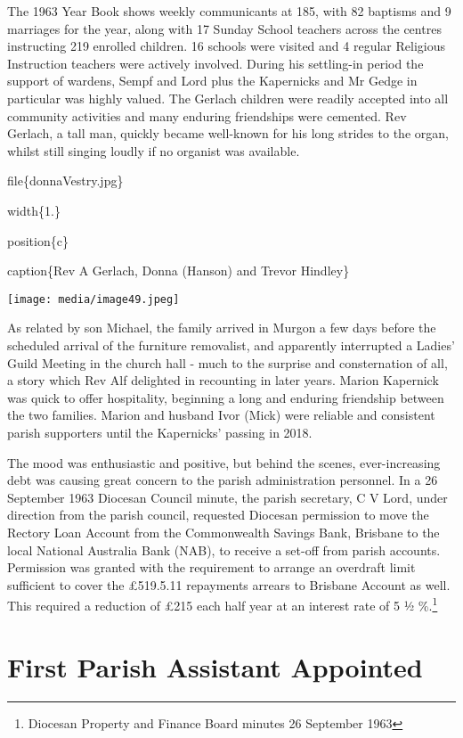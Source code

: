 The 1963 Year Book shows weekly communicants at 185, with 82 baptisms and 9 marriages for the year, along with 17 Sunday School teachers across the centres instructing 219 enrolled children. 16 schools were visited and 4 regular Religious Instruction teachers were actively involved. During his settling-in period the support of wardens, Sempf and Lord plus the Kapernicks and Mr Gedge in particular was highly valued. The Gerlach children were readily accepted into all community activities and many enduring friendships were cemented. Rev Gerlach, a tall man, quickly became well-known for his long strides to the organ, whilst still singing loudly if no organist was available.

file\{donnaVestry.jpg\}

width\{1.\}

position\{c\}

caption\{Rev A Gerlach, Donna (Hanson) and Trevor Hindley\}

\texttt{[image: media/image49.jpeg]}

As related by son Michael, the family arrived in Murgon a few days before the scheduled arrival of the furniture removalist, and apparently interrupted a Ladies' Guild Meeting in the church hall - much to the surprise and consternation of all, a story which Rev Alf delighted in recounting in later years. Marion Kapernick was quick to offer hospitality, beginning a long and enduring friendship between the two families. Marion and husband Ivor (Mick) were reliable and consistent parish supporters until the Kapernicks' passing in 2018.

The mood was enthusiastic and positive, but behind the scenes, ever-increasing debt was causing great concern to the parish administration personnel. In a 26 September 1963 Diocesan Council minute, the parish secretary, C V Lord, under direction from the parish council, requested Diocesan permission to move the Rectory Loan Account from the Commonwealth Savings Bank, Brisbane to the local National Australia Bank (NAB), to receive a set-off from parish accounts. Permission was granted with the requirement to arrange an overdraft limit sufficient to cover the £519.5.11 repayments arrears to Brisbane Account as well. This required a reduction of £215 each half year at an interest rate of 5 ½ \%.\footnote{Diocesan Property and Finance Board minutes 26 September 1963}

\hypertarget{first-parish-assistant-appointed}{%
\section{First Parish Assistant Appointed}\label{first-parish-assistant-appointed}}

